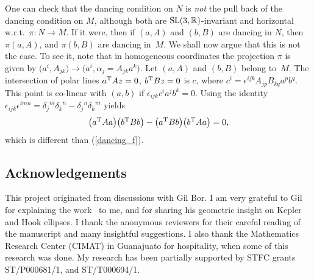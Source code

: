\documentclass[pdftex]{sigma}%
\numberwithin{equation}{section}
\newcommand{\R}{\mathbb{R}}
\begin{document}
\begin{Remark}
One can check that the dancing condition on $N$ is {\em not} the pull back of the dancing condition on $M$, although both are ${\rm SL}(3, \R)$-invariant and horizontal w.r.t.\ $\pi\colon N \to M$. If it were, then
if $(a, A)$ and $(b, B)$ are dancing in $N$, then $\pi(a, A)$, and
$\pi(b, B)$ are dancing in~$M$.
 We shall now argue that this is not the case.
To see it, note that in homogeneous coordinates the projection
$\pi$ is given by $\big(a^i, A_{jk}\big)\rightarrow \big(a^i, \alpha_j=A_{jk}a^k\big)$.
Let $(a, A)$ and $(b, B)$ belong to~$M$.
The intersection of polar lines
$a^{\rm T} A z=0$, $b^{\rm T} B z=0$
is $c$, where $c^i=\epsilon^{ijk}A_{jp}B_{kq}a^pb^q$. This point is co-linear with
$(a, b)$ if $\epsilon_{ijk}c^ia^jb^k=0$. Using the identity
$\epsilon_{ijk}\epsilon^{imn}={\delta_j}^m{\delta_k}^n-{\delta_j}^n{\delta_k}^m$
yields
\[%
\big(a^{\rm T} A a\big)\big(b^{\rm T}B b\big)- \big(a^{\rm T} B b\big)\big(b^{\rm T}Aa\big)=0,
\]
which is different than (\ref{dancing_f}).
\end{Remark}

\subsection*{Acknowledgements} This project originated from discussions
with Gil Bor. I am very grateful to Gil for explaining the work~\cite{bor}
to me, and for sharing his geometric insight on Kepler and Hook ellipses.
I thank the anonymous reviewers for their careful reading of the manuscript and many insightful suggestions. I also thank the Mathematics Research Center (CIMAT) in Guanajuato
for hospitality, when some of this research was done.
My research has been
partially supported by STFC grants ST/P000681/1,
and ST/T000694/1.
\end{document}
